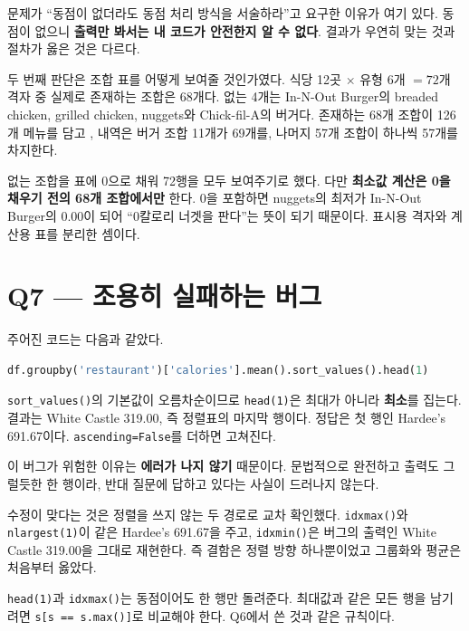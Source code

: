 \begin{keyidea}
문제가 ``동점이 없더라도 동점 처리 방식을 서술하라''고 요구한 이유가 여기 있다.
동점이 없으니 \textbf{출력만 봐서는 내 코드가 안전한지 알 수 없다}. 결과가 우연히
맞는 것과 절차가 옳은 것은 다르다.
\end{keyidea}

두 번째 판단은 조합 표를 어떻게 보여줄 것인가였다. 식당 12곳 $\times$ 유형 6개
$= 72$개 격자 중 실제로 존재하는 조합은 68개다. 없는 4개는 In-N-Out Burger의 breaded
chicken, grilled chicken, nuggets와 Chick-fil-A의 버거다. 존재하는 68개 조합이 126개
메뉴를 담고 \contains, 내역은 버거 조합 11개가 69개를, 나머지 57개 조합이 하나씩 57개를
차지한다.

없는 조합을 표에 0으로 채워 72행을 모두 보여주기로 했다. 다만 \textbf{최소값 계산은
0을 채우기 전의 68개 조합에서만} 한다. 0을 포함하면 nuggets의 최저가 In-N-Out Burger의
0.00이 되어 ``0칼로리 너겟을 판다''는 뜻이 되기 때문이다. 표시용 격자와 계산용 표를
분리한 셈이다.

\section{Q7 --- 조용히 실패하는 버그}
\label{sec:hw1-q7}

주어진 코드는 다음과 같았다.

\begin{lstlisting}[language=Python]
df.groupby('restaurant')['calories'].mean().sort_values().head(1)
\end{lstlisting}

\texttt{sort\_values()}의 기본값이 오름차순이므로 \texttt{head(1)}은 최대가 아니라
\textbf{최소}를 집는다. 결과는 White Castle 319.00, 즉 정렬표의 마지막 행이다. 정답은
첫 행인 Hardee's 691.67이다. \texttt{ascending=False}를 더하면 고쳐진다.

이 버그가 위험한 이유는 \textbf{에러가 나지 않기} 때문이다. 문법적으로 완전하고 출력도
그럴듯한 한 행이라, 반대 질문에 답하고 있다는 사실이 드러나지 않는다.

수정이 맞다는 것은 정렬을 쓰지 않는 두 경로로 교차 확인했다. \texttt{idxmax()}와
\texttt{nlargest(1)}이 같은 Hardee's 691.67을 주고, \texttt{idxmin()}은 버그의 출력인
White Castle 319.00을 그대로 재현한다. 즉 결함은 정렬 방향 하나뿐이었고 그룹화와 평균은
처음부터 옳았다.

\begin{pitfall}[고친 뒤에도 남는 문제]
\texttt{head(1)}과 \texttt{idxmax()}는 동점이어도 한 행만 돌려준다. 최대값과 같은 모든
행을 남기려면 \texttt{s[s == s.max()]}로 비교해야 한다. Q6에서 쓴 것과 같은 규칙이다.
\end{pitfall}

